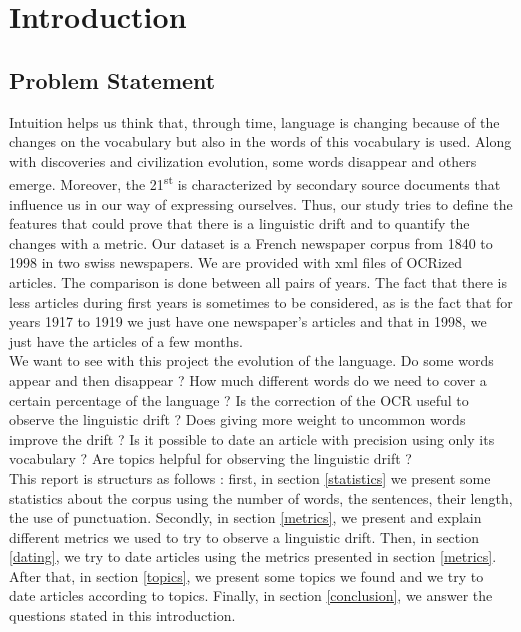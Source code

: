 \section{Introduction}

\subsection{Problem Statement}
Intuition helps us think that, through time, language is changing because of the changes on the vocabulary but also in the words of this vocabulary is used.
Along with discoveries and civilization evolution, some words disappear and others emerge. Moreover, the 21\textsuperscript{st} is characterized by secondary source documents that influence us in our way of expressing ourselves. Thus, our study tries to define the features that could prove that there is a linguistic drift and to quantify the changes with a metric.
Our dataset is a French newspaper corpus from 1840 to 1998 in two swiss newspapers. We are provided with xml files of OCRized articles. The comparison is done between all pairs of years. The fact that there is less articles during first years is sometimes to be considered, as is the fact that for years 1917 to 1919 we just have one newspaper's articles and that in 1998, we just have the articles of a few months.\\

We want to see with this project the evolution of the language. Do some words appear and then disappear ? How much different words do we need to cover a certain percentage of the language ? Is the correction of the OCR useful to observe the linguistic drift ? Does giving more weight to uncommon words improve the drift ? Is it possible to date an article with precision using only its vocabulary ? Are topics helpful for observing the linguistic drift ?\\

This report is structurs as follows : first, in section \ref{statistics} we present some statistics about the corpus using the number of words, the sentences, their length, the use of punctuation. Secondly, in section \ref{metrics}, we present and explain different metrics we used to try to observe a linguistic drift. Then, in section \ref{dating}, we try to date articles using the metrics presented in section \ref{metrics}. After that, in section \ref{topics}, we present some topics we found and we try to date articles according to topics. Finally, in section \ref{conclusion}, we answer the questions stated in this introduction.
